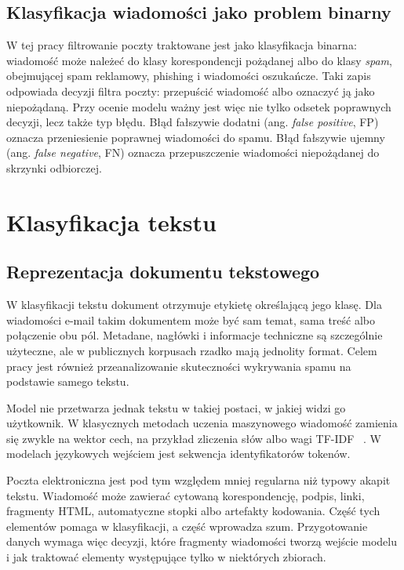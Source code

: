 \subsection{Klasyfikacja wiadomości jako problem binarny}

W tej pracy filtrowanie poczty traktowane jest jako klasyfikacja binarna:
wiadomość może należeć do klasy korespondencji pożądanej albo do klasy
\emph{spam}, obejmującej spam reklamowy, phishing i wiadomości
oszukańcze. Taki zapis odpowiada decyzji filtra poczty: przepuścić wiadomość albo 
oznaczyć ją jako niepożądaną. Przy ocenie modelu ważny jest więc nie tylko odsetek poprawnych decyzji, lecz także
typ błędu. Błąd fałszywie dodatni (ang. \emph{false positive}, FP) oznacza
przeniesienie poprawnej wiadomości do spamu. Błąd fałszywie ujemny (ang.
\emph{false negative}, FN) oznacza przepuszczenie wiadomości niepożądanej do
skrzynki odbiorczej.

\section{Klasyfikacja tekstu}

\subsection{Reprezentacja dokumentu tekstowego}

W klasyfikacji tekstu dokument otrzymuje etykietę określającą jego klasę. Dla
wiadomości e-mail takim dokumentem może być sam temat, sama treść albo połączenie
obu pól. Metadane, nagłówki i informacje techniczne są szczególnie użyteczne, ale w
publicznych korpusach rzadko mają jednolity format. Celem pracy jest również
przeanalizowanie skuteczności wykrywania spamu na podstawie samego tekstu.

Model nie przetwarza jednak tekstu w takiej postaci, w jakiej widzi go
użytkownik. W klasycznych metodach uczenia maszynowego wiadomość zamienia się
zwykle na wektor cech, na przykład zliczenia słów albo wagi TF-IDF
~\autocite{janez-martino-spam-topic-2024}. W modelach językowych wejściem jest
sekwencja identyfikatorów tokenów.

Poczta elektroniczna jest pod tym względem mniej regularna niż typowy akapit
tekstu. Wiadomość może zawierać cytowaną korespondencję, podpis, linki, fragmenty
HTML, automatyczne stopki albo artefakty kodowania. Część tych elementów pomaga
w klasyfikacji, a część wprowadza szum. Przygotowanie danych wymaga więc decyzji,
które fragmenty wiadomości tworzą wejście modelu i jak traktować elementy
występujące tylko w niektórych zbiorach.

